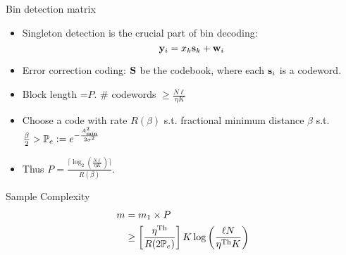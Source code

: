 \begin{frame}{Bin detection matrix}
\begin{itemize}
\item Singleton detection is the crucial part of bin decoding:
\begin{equation*}
\mathbf{y}_i=x_{k}\mathbf{s}_k +\mathbf{w}_i
\end{equation*} 
\item Error correction coding: $\mathbf{S}$ be the codebook, where each $\mathbf{s}_i$ is a codeword.
\item Block length =$P$.  $\#$ codewords $\geq \frac{N\ell}{\eta K}$
\item Choose a code with rate $R(\beta)$ s.t. fractional minimum distance $\beta$ s.t. $\frac{\beta}{2} >\mathbb{P}_{e}\mathrel{\mathop:}= e^{-\frac{A_{\text{min}}^{2}}{2\sigma^2}}$
\item Thus $P=\frac{\lceil {\log_2(\frac{N\ell}{\eta K})}\rceil}{R(\beta)}$.
\end{itemize} 

\begin{block}{Sample Complexity}
 \begin{align*}
  m&=m_1\times P \\
   &\geq \left[\frac{\eta^{\text{Th}}}{R(2\mathbb{P}_{e})}\right] K\log\left(\frac{\ell N}{\eta^{\text{Th}} K}\right)
\end{align*} 
\end{block}
\end{frame}

